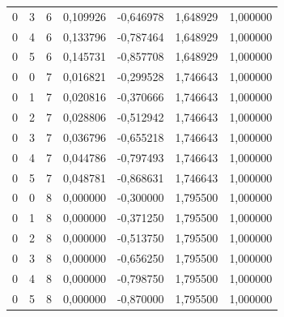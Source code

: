 \begin{apendicesenv}
\begin{table}[H]
\begin{tabular}{ccccccc}
		0 & 3 & 6 & 0,109926 & -0,646978 & 1,648929 & 1,000000 \\
		0 & 4 & 6 & 0,133796 & -0,787464 & 1,648929 & 1,000000 \\
		0 & 5 & 6 & 0,145731 & -0,857708 & 1,648929 & 1,000000 \\
		0 & 0 & 7 & 0,016821 & -0,299528 & 1,746643 & 1,000000 \\
		0 & 1 & 7 & 0,020816 & -0,370666 & 1,746643 & 1,000000 \\
		0 & 2 & 7 & 0,028806 & -0,512942 & 1,746643 & 1,000000 \\
		0 & 3 & 7 & 0,036796 & -0,655218 & 1,746643 & 1,000000 \\
		0 & 4 & 7 & 0,044786 & -0,797493 & 1,746643 & 1,000000 \\
		0 & 5 & 7 & 0,048781 & -0,868631 & 1,746643 & 1,000000 \\
		0 & 0 & 8 & 0,000000 & -0,300000 & 1,795500 & 1,000000 \\
		0 & 1 & 8 & 0,000000 & -0,371250 & 1,795500 & 1,000000 \\
		0 & 2 & 8 & 0,000000 & -0,513750 & 1,795500 & 1,000000 \\
		0 & 3 & 8 & 0,000000 & -0,656250 & 1,795500 & 1,000000 \\
		0 & 4 & 8 & 0,000000 & -0,798750 & 1,795500 & 1,000000 \\
		0 & 5 & 8 & 0,000000 & -0,870000 & 1,795500 & 1,000000 \\
		\bottomrule
	\end{tabular}
\end{table}

\end{apendicesenv}
